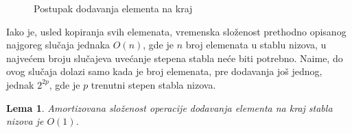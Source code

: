 \documentclass[a4paper]{article}
\newtheorem{lemma}[theorem]{Lema}
\begin{document}
\begin{figure}[h!]
    \centering
    \caption{Postupak dodavanja elementa na kraj}
    \label{fig:dodavanje-na-kraj-primer-postupak}
\end{figure}

Iako je, usled kopiranja svih elemenata, vremenska složenost prethodno opisanog najgoreg slučaja jednaka $O(n)$, gde je $n$ broj elemenata u stablu nizova, u najvećem broju slučajeva uvećanje stepena stabla neće biti potrebno. Naime, do ovog slučaja dolazi samo kada je broj elemenata, pre dodavanja još jednog, jednak $2^{2p}$, gde je $p$ trenutni stepen stabla nizova.

\begin{lemma}
Amortizovana složenost operacije dodavanja elementa na kraj stabla nizova je $O(1)$.
\end{lemma}
\end{document}
